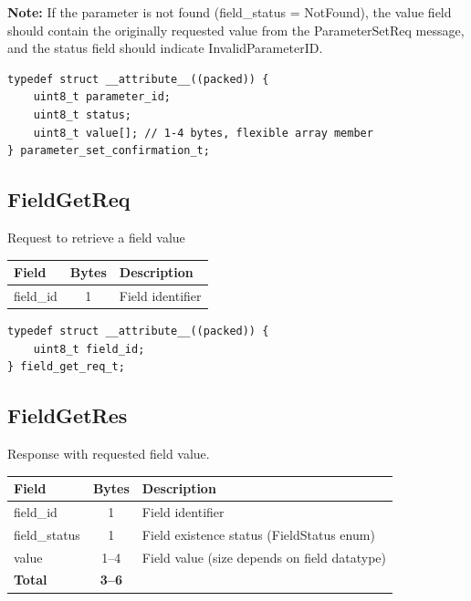 \textbf{Note:} If the parameter is not found (field\_status = NotFound), the value field should contain the originally requested value from the ParameterSetReq message, and the status field should indicate InvalidParameterID.


\begin{lstlisting}[caption={ParameterSetConfirmation struct}]
typedef struct __attribute__((packed)) {
    uint8_t parameter_id;
    uint8_t status;
    uint8_t value[]; // 1-4 bytes, flexible array member
} parameter_set_confirmation_t;
\end{lstlisting}

\subsection{FieldGetReq}\label{struct:FieldGetReq}
Request to retrieve a field value
\begin{center}
\begin{tabular}{l c l}
\toprule
Field & Bytes & Description \\
\midrule
field\_id & 1 & Field identifier \\
\bottomrule
\end{tabular}
\end{center}


\begin{lstlisting}[caption={FieldGetReq struct}]
typedef struct __attribute__((packed)) {
    uint8_t field_id;
} field_get_req_t;
\end{lstlisting}

\subsection{FieldGetRes}\label{struct:FieldGetRes}
Response with requested field value.

\begin{center}
\begin{tabular}{l c l}
\toprule
Field & Bytes & Description \\
\midrule
field\_id & 1 & Field identifier \\
field\_status & 1 & Field existence status (FieldStatus enum) \\
value & 1--4 & Field value (size depends on field datatype) \\
\midrule
\textbf{Total} & \textbf{3--6} & \\
\bottomrule
\end{tabular}
\end{center}

